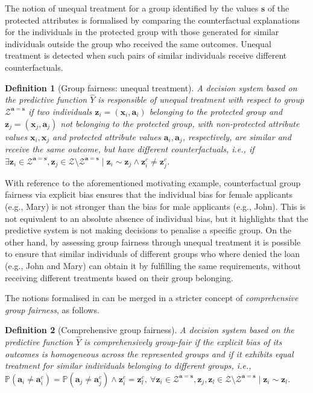 \documentclass[letterpaper]{article} %
\newtheorem{definition}{Definition}
\begin{document}
The notion of unequal treatment for a group identified by the values $\boldsymbol{s}$ of the protected attributes is formalised by comparing the counterfactual explanations for the individuals in the protected group with those generated for similar individuals outside the group who received the same outcomes.
%
Unequal treatment is detected when such pairs of similar individuals receive different counterfactuals.
%
\begin{definition}[Group fairness: unequal treatment]\label{unequal_treatment_group}
	A decision system based on the predictive function $\hat{Y}$ is responsible of \emph{unequal treatment} with respect to group $\mathcal{Z}^{\boldsymbol{a}=\boldsymbol{s}}$ if two individuals $\boldsymbol{z}_i = (\boldsymbol{x}_i, \boldsymbol{a}_i)$ belonging to the protected group and $\boldsymbol{z}_j = (\boldsymbol{x}_j, \boldsymbol{a}_j)$ not belonging to the protected group, with non-protected attribute values $\boldsymbol{x}_i, \boldsymbol{x}_j$ and protected attribute values $\boldsymbol{a}_i, \boldsymbol{a}_j$, respectively, are similar and receive the same outcome, but have different counterfactuals, i.e., if $\exists \boldsymbol{z}_i \in \mathcal{Z}^{\boldsymbol{a}=\boldsymbol{s}}, \boldsymbol{z}_j \in \mathcal{Z} \setminus \mathcal{Z}^{\boldsymbol{a}=\boldsymbol{s}} \mid \boldsymbol{z}_i \sim \boldsymbol{z}_j \wedge \boldsymbol{z}_i^c \neq \boldsymbol{z}_j^c$.
\end{definition}

With reference to the aforementioned motivating example, counterfactual group fairness via explicit bias ensures that the individual bias for female applicants (e.g., Mary) is not stronger than the bias for male applicants (e.g., John). This is not equivalent to an absolute absence of individual bias, but it highlights that the predictive system is not making decisions to penalise a specific group.
%
On the other hand, by assessing group fairness through unequal treatment it is possible to ensure that similar individuals of different groups who where denied the loan (e.g., John and Mary) can obtain it by fulfilling the same requirements, without receiving different treatments based on their group belonging.

The notions formalised in  can be merged in a stricter concept of \emph{comprehensive group fairness}, as follows.
%
\begin{definition}[Comprehensive group fairness]\label{comprehensive_group}
	A decision system based on the predictive function $\hat{Y}$ is \emph{comprehensively group-fair} if the explicit bias of its outcomes is homogeneous across the represented groups and if it exhibits equal treatment for similar individuals belonging to different groups, i.e., $\mathbb{P}(\boldsymbol{a}_{i} \neq \boldsymbol{a}_{i}^{c}) = \mathbb{P}(\boldsymbol{a}_{j} \neq \boldsymbol{a}_{j}^{c}) \wedge \boldsymbol{z}_i^c = \boldsymbol{z}_l^c, ~ \forall \boldsymbol{z}_i \in \mathcal{Z}^{\boldsymbol{a}=\boldsymbol{s}}, \boldsymbol{z}_j, \boldsymbol{z}_l \in \mathcal{Z} \setminus \mathcal{Z}^{\boldsymbol{a}=\boldsymbol{s}} \mid \boldsymbol{z}_i \sim \boldsymbol{z}_l$.
\end{definition}
\end{document}
